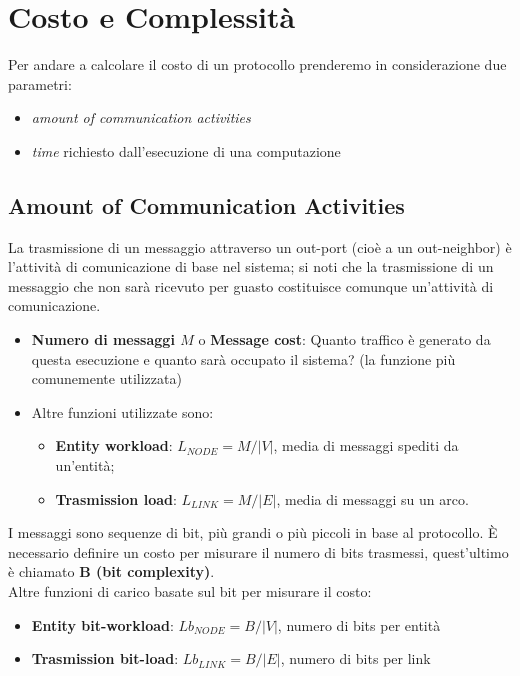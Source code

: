 \section{Costo e Complessità}
Per andare a calcolare il costo di un protocollo prenderemo in considerazione
due parametri:

\begin{itemize}
    \item \textit{amount of communication activities}
    \item \textit{time} richiesto dall'esecuzione di una computazione
\end{itemize}

\subsection{Amount of Communication Activities}
La trasmissione di un messaggio attraverso un out-port (cioè a un out-neighbor)
è l'attività di comunicazione di base nel sistema; si noti che la trasmissione
di un messaggio che non sarà ricevuto per guasto costituisce comunque
un'attività di comunicazione.

\begin{itemize}
    \item \textbf{Numero di messaggi $M$} o \textbf{Message cost}: Quanto traffico
          è generato da questa esecuzione e quanto sarà occupato il sistema? (la
          funzione più comunemente utilizzata)
    \item Altre funzioni utilizzate sono:
          \begin{itemize}
              \item \textbf{Entity workload}: $L_{NODE} = M / |V|$, media di
                    messaggi spediti da un'entità;
              \item \textbf{Trasmission load}: $L_{LINK} = M / |E|$, media di
                    messaggi su un arco.
          \end{itemize}
\end{itemize}

I messaggi sono sequenze di bit, più grandi o più piccoli in base al protocollo.
È necessario definire un costo per misurare il numero di bits trasmessi,
quest'ultimo è chiamato \textbf{B (bit complexity)}.\\
Altre funzioni di carico basate sul bit per misurare il costo:
\begin{itemize}
    \item \textbf{Entity bit-workload}: $Lb_{NODE} = B / |V|$, numero di bits per
          entità
    \item \textbf{Trasmission bit-load}: $Lb_{LINK} = B / |E|$, numero di bits per
          link
\end{itemize}

